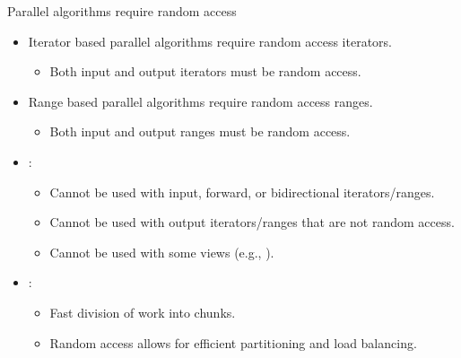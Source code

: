 \begin{frame}[t,fragile]{Parallel algorithms require random access}
\begin{itemize}
    \item Iterator based parallel algorithms require random access iterators.
      \begin{itemize}
        \item Both input and output iterators must be random access.
      \end{itemize}

    \item Range based parallel algorithms require random access ranges.
      \begin{itemize}
        \item Both input and output ranges must be random access.
      \end{itemize}

    \item {}:
      \begin{itemize}
        \item Cannot be used with input, forward, or bidirectional iterators/ranges.
        \item Cannot be used with output iterators/ranges that are not random access.
        \item Cannot be used with some views (e.g., ).
      \end{itemize}

    \item {}:
      \begin{itemize}
        \item Fast division of work into chunks.
        \item Random access allows for efficient partitioning and load balancing.
      \end{itemize}
\end{itemize}
\end{frame}


